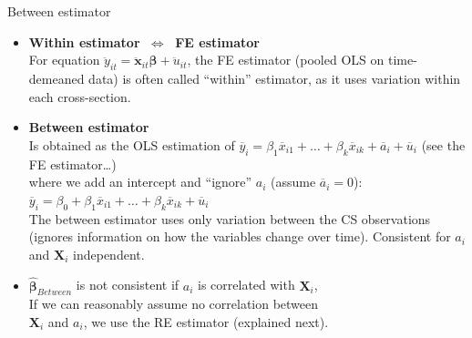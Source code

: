 \documentclass[usenames,dvipsnames]{beamer}
\begin{document}
\begin{frame}{Between estimator}
\small
\begin{itemize}
\item \textbf{Within estimator $~\Longleftrightarrow~$ FE estimator}\\
For equation  $\ddot{y}_{it} = \bm{\ddot{x}}_{it} \bm{\beta} + \ddot{u}_{it}$, the FE estimator (pooled OLS on time-demeaned data) is often called ``within'' estimator, as it uses variation within each cross-section.
\bigskip
\item \textbf{Between estimator}\\
Is obtained as the OLS estimation of $\overline{y}_i = \beta_1 \overline{x}_{i1} + \dots + \beta_k \overline{x}_{ik} + \overline{a}_i + \overline{u}_i$ \qquad (see the FE estimator\dots) \\where we add an intercept and ``ignore'' $a_i$ (assume $\overline{a}_i=0$):\\ \medskip
$\overline{y}_i = \beta_0 + \beta_1 \overline{x}_{i1} + \dots + \beta_k \overline{x}_{ik} +  \overline{u}_i$
\medskip
\\The between estimator uses only variation between the CS observations (ignores information on how the variables change over time). Consistent for $a_i$ and $\bm{X}_i$ independent.\\
\bigskip
\item $\bm{\hat{\beta}}_{\textit{Between}}$ is not consistent if $a_i$ is correlated with $\bm{X}_i$, \\If we can reasonably assume no correlation between \\$\bm{X}_i$ and $a_i$, we use the RE estimator (explained next). 
\end{itemize}
\end{frame}
\end{document}
